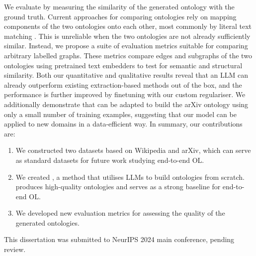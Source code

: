 We evaluate \name by measuring the similarity of the generated ontology with the ground truth. Current approaches for comparing ontologies rely on mapping components of the two ontologies onto each other, most commonly by literal text matching \cite{maedche2002measuring,Treeratpituk2013GraphbasedAT}. This is unreliable when the two ontologies are not already sufficiently similar. Instead, we propose a suite of evaluation metrics suitable for comparing arbitrary labelled graphs. These metrics compare edges and subgraphs of the two ontologies using pretrained text embedders to test for semantic and structural similarity. Both our quantitative and qualitative results reveal that an LLM can already outperform existing extraction-based methods out of the box, and the performance is further improved by finetuning with our custom regulariser. We additionally demonstrate that \name can be adapted to build the arXiv ontology using only a small number of training examples, suggesting that our model can be applied to new domains in a data-efficient way. In summary, our contributions are:
\begin{enumerate}
    \item We constructed two datasets based on Wikipedia and arXiv, which can serve as standard datasets for future work studying end-to-end OL.
    \item We created \name, a method that utilises LLMs to build ontologies from scratch. \name produces high-quality ontologies and serves as a strong baseline for end-to-end OL.
    \item We developed new evaluation metrics for assessing the quality of the generated ontologies.
\end{enumerate}

This dissertation was submitted to NeurIPS 2024 main conference, pending review.